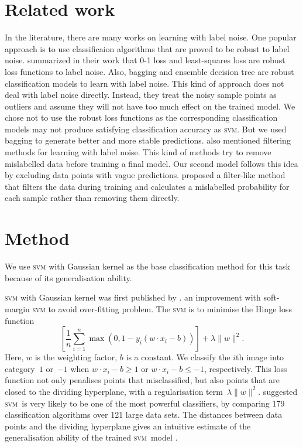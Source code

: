 \documentclass{article} %
\newcommand{\svm}{\textsc{svm}}
\begin{document}
\section{Related work}
In the literature, there are many works on learning with label noise. One popular approach is to use classificaion algorithms that are proved to be robust to label noise. \cite{frenay2014classification} summarized in their work that 0-1 loss and least-squares loss are robust loss functions to label noise. Also, bagging and ensemble decision tree are robust classification models to learn with label noise. This kind of approach does not deal with label noise directly. Instead, they treat the noisy sample points as outliers and assume they will not have too much effect on the trained model. We chose not to use the robust loss functions as the corresponding classification models may not produce satisfying classification accuracy as \textsc{svm}. But we used bagging to generate better and more stable predictions. \cite{frenay2014classification} also mentioned filtering methods for learning with label noise. This kind of methods try to remove mislabelled data before training a final model. Our second model follows this idea by excluding data points with vague predictions. \cite{yang2018adasampling} proposed a filter-like method that filters the data during training and calculates a mislabelled probability for each sample rather than removing them directly.

\section{Method}
We use \textsc{svm} with Gaussian kernel as the base classification method for this task because of its generalisation ability.

\textsc{svm} with Gaussian kernel was first published by \citet{Boser:1992:TAO:130385.130401}. \citet{Cortes1995} an improvement with soft-margin \textsc{svm} to  avoid over-fitting problem. The \textsc{svm} is to minimise the Hinge loss function
\begin{equation*}
\left[{\frac {1}{n}}\sum _{i=1}^{n}\max \left(0,1-y_{i}(w\cdot x_{i}-b)\right)\right]+\lambda \lVert w\rVert ^{2}.
\end{equation*}
Here, $w$ is the weighting factor, $b$ is a constant. We classify the $i$th image into category~$1$ or~$-1$ when $w\cdot x_{i}-b\geq1$ or $w\cdot x_{i}-b\leq-1$, respectively. This loss function not only penalises points that misclassified, but also points that are closed to the dividing hyperplane, with a regularisation term~$\lambda \lVert w\rVert ^{2}$. \citet{Fernandez-Delgado:2014:WNH:2627435.2697065} suggested \svm\ is very likely to be one of the most powerful classifiers, by comparing 179 classification algorithms over 121 large data sets. The distances between data points and the dividing hyperplane gives an intuitive estimate of the generalisation ability of the trained \svm\ model \citep{hastie01statisticallearning}.
\end{document}
